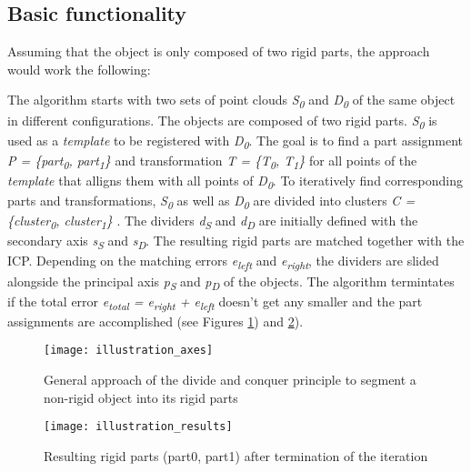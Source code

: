 \subsection{Basic functionality}

Assuming that the object is only composed of two rigid parts, the approach would work the following:

 The algorithm starts with two sets of point clouds \textit{S\textsubscript{0}} and \textit{D\textsubscript{0}} of the same object in different configurations. The objects are composed of two rigid parts. \textit{S\textsubscript{0}} is used as a \textit{template} to be registered with \textit{D\textsubscript{0}}. The goal is to find a part assignment \textit{P = \{{part\textsubscript{0}, part\textsubscript{1}\}}} and transformation \textit{T = \{T\textsubscript{0}, T\textsubscript{1}\}} for all points of the \textit{template} that alligns them with all points of \textit{D\textsubscript{0}}. To iteratively find corresponding parts and transformations, \textit{S\textsubscript{0}} as well as \textit{D\textsubscript{0}} are divided into clusters \textit{C = \{{cluster\textsubscript{0}, cluster\textsubscript{1}\}}} . The dividers \textit{d\textsubscript{S}} and \textit{d\textsubscript{D}} are initially defined with the secondary axis \textit{s\textsubscript{S}} and \textit{s\textsubscript{D}}. The resulting rigid parts are matched together with the ICP. Depending on the matching errors \textit{e\textsubscript{left}} and \textit{e\textsubscript{right}}, the dividers are slided alongside the principal axis \textit{p\textsubscript{S}} and \textit{p\textsubscript{D}} of the objects. The algorithm termintates if the total error \textit{e\textsubscript{total} = e\textsubscript{right} + e\textsubscript{left}} doesn't get any smaller and the part assignments are accomplished (see Figures \ref{fig:dc_axes_2p}) and \ref{fig:dc_results_2p}).
 
 \begin{figure}
 	\centering
 	\texttt{[image: illustration\_axes]}
 	\caption{General approach of the divide and conquer principle to segment a non-rigid object into its rigid parts}
 	\label{fig:dc_axes_2p}
 \end{figure}

 \begin{figure}
 	\centering
 	\texttt{[image: illustration\_results]}
 	\caption{Resulting rigid parts (part0, part1) after termination of the iteration}
 	\label{fig:dc_results_2p}
 \end{figure}
 
